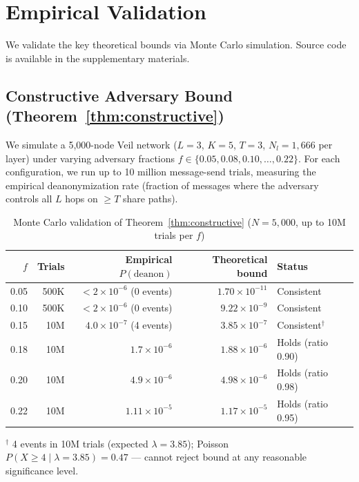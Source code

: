 \documentclass[11pt,a4paper]{article}
\begin{document}

\section{Empirical Validation}
\label{sec:empirical}

We validate the key theoretical bounds via Monte Carlo simulation. Source code is available in the supplementary materials.

\subsection{Constructive Adversary Bound (Theorem~\ref{thm:constructive})}

We simulate a 5,000-node Veil network ($L=3$, $K=5$, $T=3$, $N_l = 1{,}666$ per layer) under varying adversary fractions $f \in \{0.05, 0.08, 0.10, \ldots, 0.22\}$. For each configuration, we run up to 10 million message-send trials, measuring the empirical deanonymization rate (fraction of messages where the adversary controls all $L$ hops on $\geq T$ share paths).

\begin{table}[h]
\centering
\caption{Monte Carlo validation of Theorem~\ref{thm:constructive} ($N = 5{,}000$, up to 10M trials per $f$)}
\begin{tabular}{@{}rrrrl@{}}
\toprule
$f$ & Trials & Empirical $P(\text{deanon})$ & Theoretical bound & Status \\
\midrule
0.05 & 500K & $< 2 \times 10^{-6}$ (0 events) & $1.70 \times 10^{-11}$ & Consistent \\
0.10 & 500K & $< 2 \times 10^{-6}$ (0 events) & $9.22 \times 10^{-9}$ & Consistent \\
0.15 & 10M & $4.0 \times 10^{-7}$ (4 events) & $3.85 \times 10^{-7}$ & Consistent$^\dagger$ \\
0.18 & 10M & $1.7 \times 10^{-6}$ & $1.88 \times 10^{-6}$ & Holds (ratio 0.90) \\
0.20 & 10M & $4.9 \times 10^{-6}$ & $4.98 \times 10^{-6}$ & Holds (ratio 0.98) \\
0.22 & 10M & $1.11 \times 10^{-5}$ & $1.17 \times 10^{-5}$ & Holds (ratio 0.95) \\
\bottomrule
\end{tabular}

\smallskip
{\footnotesize $^\dagger$ 4 events in 10M trials (expected $\lambda = 3.85$); Poisson $P(X \geq 4 \mid \lambda = 3.85) = 0.47$ — cannot reject bound at any reasonable significance level.}
\end{table}
\end{document}
